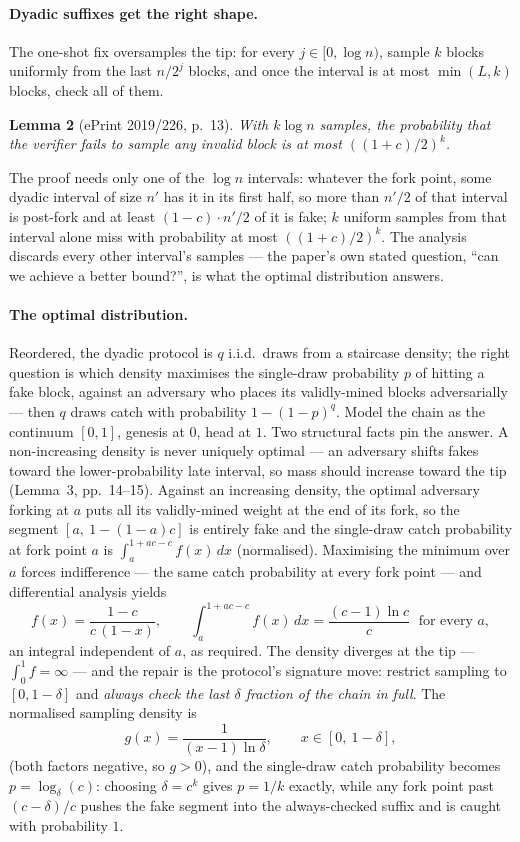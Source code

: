 \documentclass[11pt,a4paper]{article}
\theoremstyle{definition}
\begin{document}
\paragraph{Dyadic suffixes get the right shape.} The one-shot fix
oversamples the tip: for every $j \in [0, \log n)$, sample $k$ blocks
uniformly from the last $n/2^j$ blocks, and once the interval is at most
$\min(L, k)$ blocks, check all of them.

\medskip
\noindent\textbf{Lemma 2} (ePrint 2019/226, p.~13). \emph{With $k \log n$
samples, the probability that the verifier fails to sample any invalid
block is at most $((1+c)/2)^k$.}
\medskip

The proof needs only one of the $\log n$ intervals: whatever the fork
point, some dyadic interval of size $n'$ has it in its first half, so
more than $n'/2$ of that interval is post-fork and at least
$(1-c) \cdot n'/2$ of it is fake; $k$ uniform samples from that interval
alone miss with probability at most $((1+c)/2)^k$. The analysis discards
every other interval's samples --- the paper's own stated question,
``can we achieve a better bound?'', is what the optimal distribution
answers.

\paragraph{The optimal distribution.} Reordered, the dyadic protocol is
$q$ i.i.d.\ draws from a staircase density; the right question is which
density maximises the single-draw probability $p$ of hitting a fake
block, against an adversary who places its validly-mined blocks
adversarially --- then $q$ draws catch with probability $1 - (1-p)^q$.
Model the chain as the continuum $[0, 1]$, genesis at $0$, head at $1$.
Two structural facts pin the answer. A non-increasing density is never
uniquely optimal --- an adversary shifts fakes toward the
lower-probability late interval, so mass should increase toward the tip
(Lemma~3, pp.~14--15). Against an increasing density, the optimal
adversary forking at $a$ puts all its validly-mined weight at the end of
its fork, so the segment $[a,\ 1 - (1-a)c]$ is entirely fake and the
single-draw catch probability at fork point $a$ is
$\int_a^{1+ac-c} f(x)\,dx$ (normalised). Maximising the minimum over $a$
forces indifference --- the same catch probability at every fork point
--- and differential analysis yields
\[
f(x) = \frac{1-c}{c\,(1-x)},
\qquad
\int_a^{1+ac-c} f(x)\,dx = \frac{(c-1)\ln c}{c}
\;\text{ for every } a,
\]
an integral independent of $a$, as required. The density diverges at the
tip --- $\int_0^1 f = \infty$ --- and the repair is the protocol's
signature move: restrict sampling to $[0, 1-\delta]$ and \emph{always
check the last $\delta$ fraction of the chain in full}. The normalised
sampling density is
\[
g(x) = \frac{1}{(x-1)\ln \delta}, \qquad x \in [0,\ 1-\delta],
\]
(both factors negative, so $g > 0$), and the single-draw catch
probability becomes $p = \log_\delta(c)$: choosing $\delta = c^k$ gives
$p = 1/k$ exactly, while any fork point past $(c - \delta)/c$ pushes the
fake segment into the always-checked suffix and is caught with
probability $1$.
\end{document}
